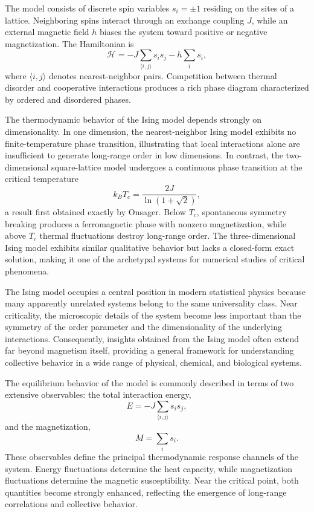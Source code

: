 The model consists of discrete spin variables \(s_i=\pm 1\) residing on
the sites of a lattice. Neighboring spins interact through an exchange
coupling \(J\), while an external magnetic field \(h\) biases the system
toward positive or negative magnetization. The Hamiltonian is
%
\begin{equation}
\mathcal{H}
=
-J
\sum_{\langle i,j\rangle}
s_i s_j
-
h
\sum_i s_i ,
\end{equation}
%
where \(\langle i,j\rangle\) denotes nearest-neighbor pairs. Competition
between thermal disorder and cooperative interactions produces a rich
phase diagram characterized by ordered and disordered phases.

The thermodynamic behavior of the Ising model depends strongly on
dimensionality. In one dimension, the nearest-neighbor Ising model
exhibits no finite-temperature phase transition, illustrating that
local interactions alone are insufficient to generate long-range order
in low dimensions. In contrast, the two-dimensional square-lattice
model undergoes a continuous phase transition at the critical
temperature
%
\begin{equation}
k_B T_c
=
\frac{2J}{\ln(1+\sqrt{2})},
\end{equation}
%
a result first obtained exactly by Onsager. Below \(T_c\), spontaneous
symmetry breaking produces a ferromagnetic phase with nonzero
magnetization, while above \(T_c\) thermal fluctuations destroy
long-range order. The three-dimensional Ising model exhibits similar
qualitative behavior but lacks a closed-form exact solution, making it
one of the archetypal systems for numerical studies of critical
phenomena.

The Ising model occupies a central position in modern statistical
physics because many apparently unrelated systems belong to the same
universality class. Near criticality, the microscopic details of the
system become less important than the symmetry of the order parameter
and the dimensionality of the underlying interactions. Consequently,
insights obtained from the Ising model often extend far beyond
magnetism itself, providing a general framework for understanding
collective behavior in a wide range of physical, chemical, and
biological systems.

The equilibrium behavior of the model is commonly described in terms
of two extensive observables: the total interaction energy,
%
\begin{equation}
E
=
-J
\sum_{\langle i,j\rangle}
s_i s_j ,
\end{equation}
%
and the magnetization,
%
\begin{equation}
M
=
\sum_i s_i .
\end{equation}
%
These observables define the principal thermodynamic response channels
of the system. Energy fluctuations determine the heat capacity, while
magnetization fluctuations determine the magnetic susceptibility. Near
the critical point, both quantities become strongly enhanced,
reflecting the emergence of long-range correlations and collective
behavior.

